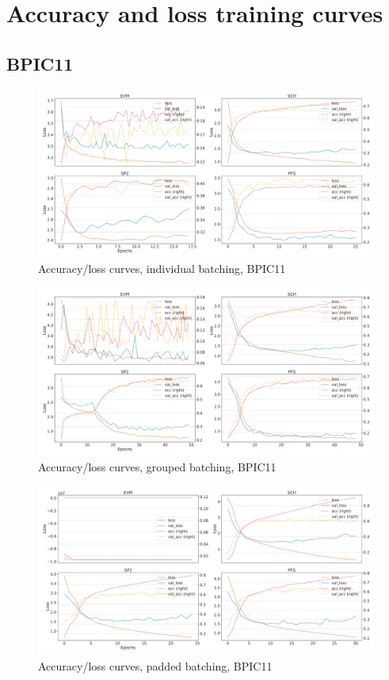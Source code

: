 \chapter{Accuracy and loss training curves}
\label{appendix:loss-curves}

\section*{BPIC11}
\begin{figure}[!htb]
    \centering
    \includegraphics[width=\textwidth]{gfx/bpic2011/individual_loss_acc_curve.pdf}
    \caption{Accuracy/loss curves, individual batching, BPIC11}
\end{figure}
\begin{figure}[!htb]
    \centering
    \includegraphics[width=\textwidth]{gfx/bpic2011/grouped_loss_acc_curve.pdf}
    \caption{Accuracy/loss curves, grouped batching, BPIC11}
\end{figure}
\begin{figure}[!htb]
    \centering
    \includegraphics[width=\textwidth]{gfx/bpic2011/padded_loss_acc_curve.pdf}
    \caption{Accuracy/loss curves, padded batching, BPIC11}
\end{figure}
